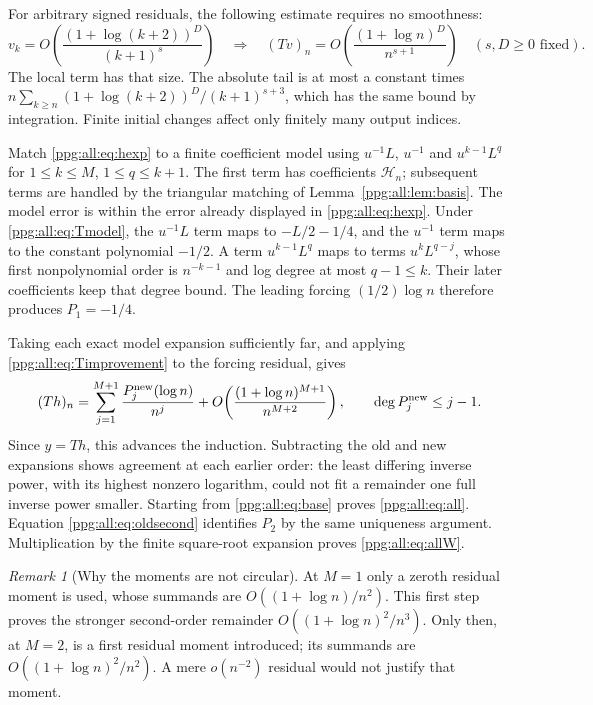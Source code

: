 \documentclass[11pt,letterpaper]{article}
\theoremstyle{remark}\newtheorem{remark}[theorem]{Remark}
\numberwithin{equation}{section}
\newcommand{\HH}{\mathcal H}
\begin{document}
For arbitrary signed residuals, the following estimate requires no smoothness:
\begin{equation}\label{ppg:all:eq:Timprovement}
 v_k=O\!\left(\frac{(1+\log(k+2))^D}{(k+1)^s}\right)
 \quad\Longrightarrow\quad
 (Tv)_n=O\!\left(\frac{(1+\log n)^D}{n^{s+1}}\right)
 \quad(s,D\ge0\text{ fixed}).
\end{equation}
The local term has that size. The absolute tail is at most a constant times
$n\sum_{k\ge n}(1+\log(k+2))^D/(k+1)^{s+3}$, which has the same bound by integration. Finite initial changes affect only finitely many output indices.

Match \eqref{ppg:all:eq:hexp} to a finite coefficient model using $u^{-1}L$, $u^{-1}$ and $u^{k-1}L^q$ for $1\le k\le M$, $1\le q\le k+1$. The first term has coefficients $\HH_n$; subsequent terms are handled by the triangular matching of Lemma~\ref{ppg:all:lem:basis}. The model error is within the error already displayed in \eqref{ppg:all:eq:hexp}. Under \eqref{ppg:all:eq:Tmodel}, the $u^{-1}L$ term maps to $-L/2-1/4$, and the $u^{-1}$ term maps to the constant polynomial $-1/2$. A term $u^{k-1}L^q$ maps to terms $u^kL^{q-j}$, whose first nonpolynomial order is $n^{-k-1}$ and log degree at most $q-1\le k$. Their later coefficients keep that degree bound. The leading forcing $(1/2)\log n$ therefore produces $P_1=-1/4$.

Taking each exact model expansion sufficiently far, and applying \eqref{ppg:all:eq:Timprovement} to the forcing residual, gives
\[
 (Th)_n=\sum_{j=1}^{M+1}\frac{P_j^{\rm new}(\log n)}{n^j}
      +O\!\left(\frac{(1+\log n)^{M+1}}{n^{M+2}}\right),
 \qquad\deg P_j^{\rm new}\le j-1.
\]
Since $y=Th$, this advances the induction. Subtracting the old and new expansions shows agreement at each earlier order: the least differing inverse power, with its highest nonzero logarithm, could not fit a remainder one full inverse power smaller. Starting from \eqref{ppg:all:eq:base} proves \eqref{ppg:all:eq:all}. Equation \eqref{ppg:all:eq:oldsecond} identifies $P_2$ by the same uniqueness argument. Multiplication by the finite square-root expansion proves \eqref{ppg:all:eq:allW}.

\begin{remark}[Why the moments are not circular]
At $M=1$ only a zeroth residual moment is used, whose summands are $O((1+\log n)/n^2)$. This first step proves the stronger second-order remainder $O((1+\log n)^2/n^3)$. Only then, at $M=2$, is a first residual moment introduced; its summands are $O((1+\log n)^2/n^2)$. A mere $o(n^{-2})$ residual would not justify that moment.
\end{remark}
\end{document}
